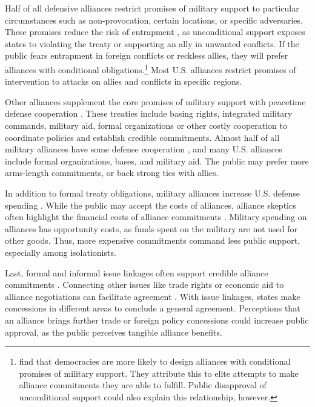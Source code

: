 \documentclass[12pt]{article}
\begin{document}
Half of all defensive alliances restrict promises of military support to particular circumstances such as non-provocation, certain locations, or specific adversaries. 
These promises reduce the risk of entrapment \citep{Benson2012}, as unconditional support exposes states to violating the treaty or supporting an ally in unwanted conflicts.
If the public fears entrapment in foreign conflicts or reckless allies, they will prefer alliances with conditional obligations.\footnote{\citep{Chibaetal2015} find that democracies are more likely to design alliances with conditional promises of military support. They attribute this to elite attempts to make alliance commitments they are able to fulfill. Public disapproval of unconditional support could also explain this relationship, however.}
Most U.S. alliances restrict promises of intervention to attacks on allies and conflicts in specific regions. 


Other alliances supplement the core promises of military support with peacetime defense cooperation \citep{Morrow1994, LeedsAnac2005}. 
These treaties include basing rights, integrated military commands, military aid, formal organizations or other costly cooperation to coordinate policies and establish credible commitments.
Almost half of all military alliances have some defense cooperation \citep{Leedsetal2002}, and many U.S. alliances include formal organizations, bases, and military aid. 
The public may prefer more arms-length commitments, or back strong ties with allies. 


In addition to formal treaty obligations, military alliances increase U.S. defense spending \citep{AlleyFuhrmann2021}. 
While the public may accept the costs of alliances, alliance skeptics often highlight the financial costs of alliance commitments \citep{Posen2014}. 
Military spending on alliances has opportunity costs, as funds spent on the military are not used for other goods. 
Thus, more expensive commitments command less public support, especially among isolationists. 


Last, formal and informal issue linkages often support credible alliance commitments \citep{Poast2013}. 
Connecting other issues like trade rights or economic aid to alliance negotiations can facilitate agreement \citep{Poast2012}.
With issue linkages, states make concessions in different areas to conclude a general agreement. 
Perceptions that an alliance brings further trade or foreign policy concessions could increase public approval, as the public perceives tangible alliance benefits.   
\end{document}

